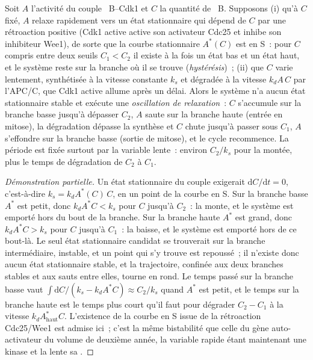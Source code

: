\begin{theorem}\label{thm:b3:cell-cycle-apoptosis:oscillator}
Soit $A$ l'activité du couple ~B--Cdk1 et $C$ la quantité de
~B. Supposons (i) qu'à $C$ fixé, $A$ relaxe rapidement vers un
état stationnaire qui dépend de $C$ par une rétroaction positive (Cdk1
active active son activateur Cdc25 et inhibe son inhibiteur Wee1), de
sorte que la courbe stationnaire $A^{*}(C)$ est en S~: pour $C$ compris
entre deux seuils $C_{1} < C_{2}$ il existe à la fois un état bas et un
état haut, et le système reste sur la branche où il se trouve
(\emph{hystérésis})~; (ii) que $C$ varie lentement, synthétisée à la
vitesse constante $k_{s}$ et dégradée à la vitesse $k_{d}A\,C$ par
l'APC/C, que Cdk1 active allume après un délai. Alors le système n'a
aucun état stationnaire stable et exécute une \emph{oscillation de
relaxation}~: $C$ s'accumule sur la branche basse jusqu'à dépasser
$C_{2}$, $A$ saute sur la branche haute (entrée en mitose), la
dégradation dépasse la synthèse et $C$ chute jusqu'à passer sous
$C_{1}$, $A$ s'effondre sur la branche basse (sortie de mitose), et le
cycle recommence. La période est fixée surtout par la variable lente~:
environ $C_{2}/k_{s}$ pour la montée, plus le temps de dégradation de
$C_{2}$ à $C_{1}$.
\end{theorem}
\begin{proof}[Démonstration partielle]
Un état stationnaire du couple exigerait
$\mathrm{d}C/\mathrm{d}t = 0$, c'est-à-dire $k_{s} = k_{d}A^{*}(C)\,C$,
en un point de la courbe en S. Sur la branche basse $A^{*}$ est petit,
donc $k_{d}A^{*}C < k_{s}$ pour $C$ jusqu'à $C_{2}$~: la  monte,
et le système est emporté hors du bout de la branche. Sur la branche
haute $A^{*}$ est grand, donc $k_{d}A^{*}C > k_{s}$ pour $C$ jusqu'à
$C_{1}$~: la  baisse, et le système est emporté hors de ce
bout-là. Le seul état stationnaire candidat se trouverait sur la
branche intermédiaire, instable, et un point qui s'y trouve est
repoussé~; il n'existe donc aucun état stationnaire stable, et la
trajectoire, confinée aux deux branches stables et aux sauts entre
elles, tourne en rond. Le temps passé sur la branche basse vaut
$\int \mathrm{d}C/(k_{s} - k_{d}A^{*}C) \approx C_{2}/k_{s}$ quand
$A^{*}$ est petit, et le temps sur la branche haute est le temps plus
court qu'il faut pour dégrader $C_{2} - C_{1}$ à la vitesse
$k_{d}A^{*}_{\text{haut}}C$. L'existence de la courbe en S issue de la
rétroaction Cdc25/Wee1 est admise ici~; c'est la même bistabilité que
celle du gène auto-activateur du volume de deuxième année, la variable
rapide étant maintenant une kinase et la lente sa .
\end{proof}

